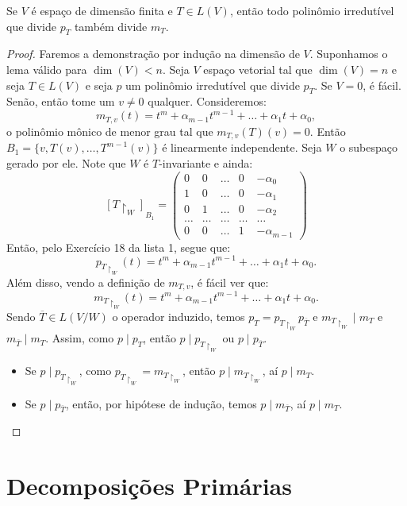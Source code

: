 \documentclass[11pt,twoside,a4paper]{book}
\begin{document}
\begin{teorema}\label{cayley-hamilton-avesso}
Se $V$ é espaço de dimensão finita e $T\in L(V)$, então todo polinômio irredutível que divide $p_T$ também divide $m_T$.
\end{teorema}
\begin{proof}
Faremos a demonstração por indução na dimensão de $V$. Suponhamos o lema válido para $\dim(V)<n$. Seja $V$ espaço vetorial tal que $\dim(V)=n$ e seja $T\in L(V)$ e seja $p$ um polinômio irredutível que divide $p_T$. Se $V=0$, é fácil. Senão, então tome um $v\neq 0$ qualquer. Consideremos:
\[
m_{T,v}(t)=t^m+\alpha_{m-1}t^{m-1}+\dots+\alpha_1 t+\alpha_0,
\]
o polinômio mônico de menor grau tal que \(m_{T,v}(T)(v)=0\). Então \(B_1=\{v,T(v),\ldots, T^{m-1}(v)\}\) é linearmente independente. Seja \(W\) o subespaço gerado por ele. Note que \(W\) é \(T\)-invariante e ainda:
\[[T\upharpoonright_W]_{B_1}=\begin{pmatrix}
0 & 0 & \ldots& 0 & -\alpha_0
\\ 1 & 0 & \ldots & 0 & -\alpha_1
\\ 0 & 1 & \ldots & 0 & -\alpha_2
\\ \ldots & \ldots  & \ldots  & \ldots  & \ldots \
\\ 0 & 0 & \ldots & 1 & -\alpha_{m-1} 
\end{pmatrix}\]
Então, pelo Exercício 18 da lista 1, segue que:
\[
p_{T \upharpoonright_{W}}(t)=
t^m + \alpha_{m-1}t^{m-1} + \ldots + \alpha_1t+\alpha_0.
\]
Além disso, vendo a definição de $m_{T,v}$, é fácil ver que:
\[
m_{T \upharpoonright_{W}}(t)=
t^m + \alpha_{m-1}t^{m-1} + \ldots + \alpha_1t+\alpha_0.
\]
Sendo $\overline{T}\in L(V/W)$ o operador induzido, temos $p_T=p_{T\upharpoonright_W}p_{\overline{T}}$ e $m_{T\upharpoonright_W}\mid m_T$ e $m_{\overline{T}}\mid m_T$. Assim, como $p\mid p_T$, então $p\mid p_{T\upharpoonright_W}$ ou $p\mid p_{\overline{T}}$.
\begin{itemize}
\item Se $p\mid p_{T\upharpoonright_W}$, como $p_{T\upharpoonright_W}=m_{T\upharpoonright_W}$, então $p\mid m_{T\upharpoonright_W}$, aí $p\mid m_T$.
\item Se $p\mid p_{\overline{T}}$, então, por hipótese de indução, temos $p\mid m_{\overline T}$, aí $p\mid m_T$. \qedhere
\end{itemize}
\end{proof}

\section{Decomposições Primárias}
\end{document}
